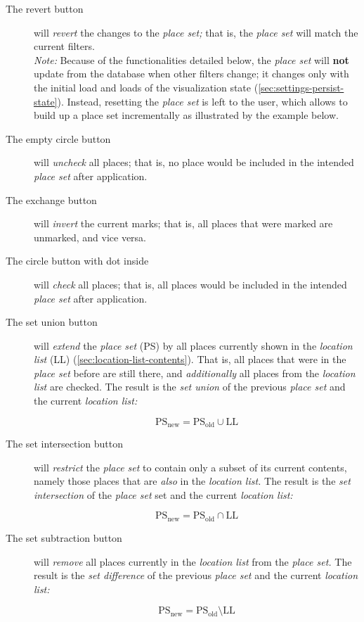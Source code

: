 \begin{description}
  \item[The revert button]
    will \emph{revert} the changes to the \emph{place set;}
    that is, the \emph{place set} will match the current filters. \\
    \emph{Note:} Because of the functionalities detailed below, the \emph{place set} will \textbf{not} update from the database when other filters change;
    it changes only with the initial load and loads of the visualization state (\cref{sec:settings-persist-state}).
    Instead, resetting the \emph{place set} is left to the user, which allows to build up a place set incrementally as illustrated by the example below.

  \item[The empty circle button]
    will \emph{uncheck} all places;
    that is, no place would be included in the intended \emph{place set} after application.
  \item[The exchange button]
    will \emph{invert} the current marks;
    that is, all places that were marked are unmarked, and vice versa.
  \item[The circle button with dot inside]
    will \emph{check} all places;
    that is, all places would be included in the intended \emph{place set} after application.
  \item[The set union button]
    will \emph{extend} the \emph{place set} (PS) by all places currently shown in the \emph{location list} (LL) (\cref{sec:location-list-contents}).
    That is, all places that were in the \emph{place set} before are still there, and \emph{additionally} all places from the \emph{location list} are checked.
    The result is the \emph{set union} of the previous \emph{place set} and the current \emph{location list:}

    \[ \text{PS}_\text{new} = \text{PS}_\text{old} \cup \text{LL} \]
  \item[The set intersection button]
    will \emph{restrict} the \emph{place set} to contain only a subset of its current contents, namely those places that are \emph{also} in the \emph{location list.}
    The result is the \emph{set intersection} of the \emph{place set} set and the current \emph{location list:}

    \[ \text{PS}_\text{new} = \text{PS}_\text{old} \cap \text{LL} \]

  \item[The set subtraction button]
    will \emph{remove} all places currently in the \emph{location list} from the \emph{place set.}
    The result is the \emph{set difference} of the previous \emph{place set} and the current \emph{location list:}

    \[ \text{PS}_\text{new} = \text{PS}_\text{old} \setminus \text{LL} \]
\end{description}

